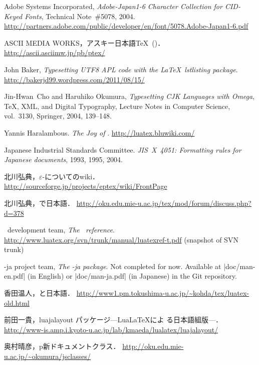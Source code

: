 \documentclass{ajt}
\begin{document}
\providecommand{\bysame}{\leavevmode\hbox to3em{\hrulefill}\thinspace}
\providecommand{\href}[2]{#2}
\begin{thebibliography}{99}

Adobe Systems Incorporated, \emph{Adobe-Japan1-6 Character Collection
	for CID-Keyed Fonts}, Technical Note~\#5078, 2004.
\url{http://partners.adobe.com/public/developer/en/font/5078.Adobe-Japan1-6.pdf}

ASCII MEDIA WORKS，アスキー日本語\TeX\ (\pTeX)．\url{http://ascii.asciimw.jp/pb/ptex/}

John Baker, \emph{Typesetting UTF8 APL code with the \LaTeX\ lstlisting package}.
\url{http://bakerjd99.wordpress.com/2011/08/15/}

Jin-Hwan~Cho and Haruhiko Okumura, \emph{Typesetting CJK Languages with Omega},
\TeX, XML, and Digital Typography, Lecture Notes in Computer Science, vol.~3130,
Springer, 2004, 139--148.

Yannis Haralambous. \emph{The Joy of \LuaTeX}. \url{http://luatex.bluwiki.com/}

Japanese Industrial Standards Committee. \emph{JIS~X~4051: Formatting
	rules for Japanese documents}, 1993, 1995, 2004.

北川弘典，$\varepsilon$-\pTeX についてのwiki．
\url{http://sourceforge.jp/projects/eptex/wiki/FrontPage}

北川弘典，\LuaTeX で日本語．
\url{http://oku.edu.mie-u.ac.jp/tex/mod/forum/discuss.php?d=378}

\LuaTeX\ development team, \emph{The \LuaTeX\ reference}. 
\url{http://www.luatex.org/svn/trunk/manual/luatexref-t.pdf} (snapshot of SVN trunk)

\LuaTeX-ja project team, \emph{The \LuaTeX-ja package}. 
Not completed for now. Available at |doc/man-en.pdf| (in English) or
	|doc/man-ja.pdf| (in Japanese)
in the Git repository.

香田温人，\LuaTeX と日本語．
\url{http://www1.pm.tokushima-u.ac.jp/~kohda/tex/luatex-old.html}

前田一貴，luajalayout パッケージ---Lua\LaTeX によ
	る日本語組版---．
\url{http://www-is.amp.i.kyoto-u.ac.jp/lab/kmaeda/lualatex/luajalayout/}

奥村晴彦，p\LaTeXe 新ドキュメントクラス．
\url{http://oku.edu.mie-u.ac.jp/~okumura/jsclasses/}


\end{thebibliography}
\end{document}
